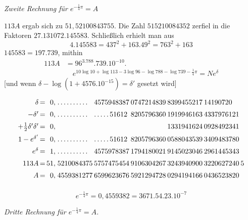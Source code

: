 
\begin{center}\emph{Zweite Rechnung für $e^{-\frac14\pi}=A$}\end{center}

$113A$ ergab sich zu $51{,}52100843755$. Die Zahl $515210084352$ zerfiel in die Faktoren $27.131072.145583$.
Schließlich erhielt man aus
\[
4.145583=437^2+163.49^2=763^2+163
\]
$145583=197.739$, mithin
\[
\begin{aligned}113A&=96^3.788.739.10^{-10}.\\[7pt]&\quad{}e^{10\log10+\log113-3\log96-\log788-\log739-\frac14\pi}=Ne^\delta\end{aligned}
\]
[und wenn $\delta-\log(1+4576.10^{-15})=\delta'$ gesetzt wird]

\begingroup\footnotesize\setlength{\arraycolsep}{1pt}\renewcommand{\arraystretch}{1.12}\[
\begin{array}{r@{\,=\,}r@{\;}l@{\hspace{2pt}}l@{\hspace{2pt}}l@{\hspace{2pt}}l@{\hspace{2pt}}l@{\hspace{2pt}}l}
\delta & 0{,} & .\,.\,.\,.\,.\,.\,.\,.\,.\,. & 4575948387 & 0747214839 & 8399455217 & 14190720 & \\[5pt]
-\delta' & 0{,} & .\,.\,.\,.\,.\,.\,.\,.\,.\,. & .\,.\,.\,.\,.\,51612 & 8205796360 & 1919946163 & 4337976121 & \\[5pt]
+\tfrac12\delta'\delta' & 0{,} &  &  &  & 1331941624 & 0928492341 & \\[5pt]
1-e^{\delta'} & 0{,} & .\,.\,.\,.\,.\,.\,.\,.\,.\,. & .\,.\,.\,.\,.\,51612 & 8205796360 & 0588043539 & 3409483780 & \\[5pt]
e^\delta & 1{,} & .\,.\,.\,.\,.\,.\,.\,.\,.\,. & 4575978387 & 1794180021 & 9145023046 & 2961445343 & \\[5pt]
113A & 51{,} & 5210084375 & 5757475454 & 9106304267 & 3243940900 & 3220627240 & 5\\[5pt]
A & 0{,} & 4559381277 & 6599623676 & 5921294728 & 0294194166 & 0436523820 & \\[5pt]
\end{array}
\]\endgroup

\[
e^{-\frac14\pi}=0{,}4559382=3671.54.23.10^{-7}
\]

\begin{center}\emph{Dritte Rechnung für $e^{-\frac14\pi}=A$.}\end{center}

